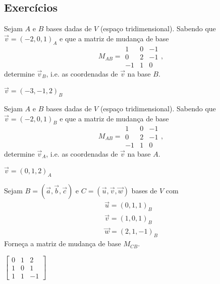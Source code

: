 \subsection*{Exercícios}

\begin{exer}
  Sejam $A$ e $B$ bases dadas de $V$ (espaço tridimensional). Sabendo que $\vec{v}=(-2,0,1)_A$ e que a matriz de mudança de base
  \begin{equation}
    M_{AB} =
    \begin{matrix}
      1 & 0 & -1 \\
      0 & 2 & -1 \\
      -1 & 1 & 0
    \end{matrix},
  \end{equation}
  determine $\vec{v}_B$, i.e. as coordenadas de $\vec{v}$ na base $B$.
\end{exer}
\begin{resp}
  $\vec{v}=(-3,-1,2)_{B}$
\end{resp}

\begin{exer}
  Sejam $A$ e $B$ bases dadas de $V$ (espaço tridimensional). Sabendo que $\vec{v}=(-2,0,1)_B$ e que a matriz de mudança de base
  \begin{equation}
    M_{AB} =
    \begin{matrix}
      1 & 0 & -1 \\
      0 & 2 & -1 \\
      -1 & 1 & 0
    \end{matrix},
  \end{equation}
  determine $\vec{v}_A$, i.e. as coordenadas de $\vec{v}$ na base $A$.
\end{exer}
\begin{resp}
  $\vec{v}=(0,1,2)_{A}$
\end{resp}

\begin{exer}
  Sejam $B=(\vec{a},\vec{b},\vec{c})$ e $C=(\vec{u},\vec{v},\vec{w})$ bases de $V$ com
  \begin{gather}
    \vec{u} = (0,1,1)_B\\
    \vec{v} = (1,0,1)_B\\
    \vec{w} = (2,1,-1)_B
  \end{gather}
  Forneça a matriz de mudança de base $M_{CB}$.
\end{exer}
\begin{resp}
  $\displaystyle
  \begin{bmatrix}
    0 & 1 & 2\\
    1 & 0 & 1\\
    1 & 1 & -1
  \end{bmatrix}
$
\end{resp}

